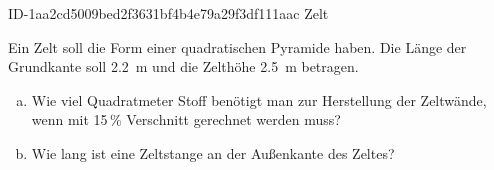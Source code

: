 \begin{exercise}
      {ID-1aa2cd5009bed2f3631bf4b4e79a29f3df111aac}
      {Zelt}
  \ifproblem\problem\par
    Ein Zelt soll die Form einer quadratischen
    Pyramide haben. Die Länge der Grundkante
    soll \SI{2.2}{\metre} und die Zelthöhe
    \SI{2.5}{\metre} betragen.
    \begin{enumerate}[a)]
      \item Wie viel Quadratmeter Stoff benötigt
            man zur Herstellung der Zeltwände,
            wenn mit \num{15}\,{\%} Verschnitt
            gerechnet werden muss?
      \item Wie lang ist eine Zeltstange an der
            Außenkante des Zeltes?
    \end{enumerate}
  \fi
\end{exercise}
